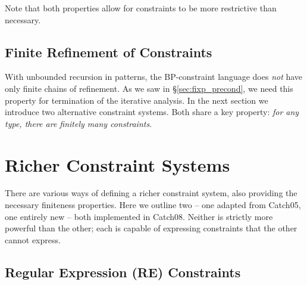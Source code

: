 \documentclass[preprint]{sigplanconf}
\begin{document}
\noindent Note that both properties allow for constraints to be more restrictive than necessary.

\subsection{Finite Refinement of Constraints}
\label{sec:bounded}

With unbounded recursion in patterns, the BP-constraint language does \textit{not} have only finite chains of refinement. As we saw in \S\ref{sec:fixp_precond}, we need this property for termination of the iterative analysis. In the next section we introduce two alternative constraint systems. Both share a key property: \textit{for any type, there are finitely many constraints}.


\section{Richer Constraint Systems}
\label{sec:constraint}

There are various ways of defining a richer constraint system, also providing the necessary finiteness properties. Here we outline two -- one adapted from Catch05, one entirely new -- both implemented in Catch08. Neither is strictly more powerful than the other; each is capable of expressing constraints that the other cannot express.

\subsection{Regular Expression (RE) Constraints}
\label{sec:regexp}
\end{document}
